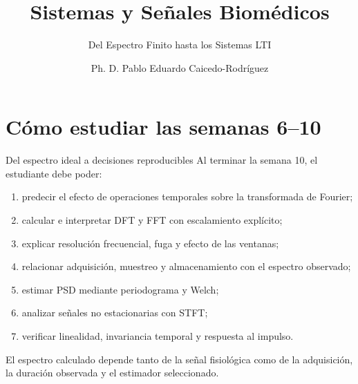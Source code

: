\documentclass[
  ignorenonframetext,
  aspectratio=169,
  spanish,
]{beamer}
\title{\texorpdfstring{Sistemas y Señales
Biomédicos}{Sistemas y Señales Biomédicos}}
\subtitle{\texorpdfstring{Del Espectro Finito hasta los Sistemas
LTI}{Del Espectro Finito hasta los Sistemas LTI}}
\author{Ph. D. Pablo Eduardo Caicedo-Rodríguez}
\date{}
\providecommand{\faExclamation}{\faIcon{exclamation}}
\providecommand{\tightlist}{%
  \setlength{\itemsep}{0pt}\setlength{\parskip}{0pt}}
\begin{document}
\frame{\titlepage}


\section{Cómo estudiar las semanas
  6--10}\label{cuxf3mo-estudiar-las-semanas-610}

\begin{frame}{Del espectro ideal a decisiones reproducibles}
  \protect{}\label{del-espectro-ideal-a-decisiones-reproducibles}
  Al terminar la semana 10, el estudiante debe poder:

  \begin{enumerate}
    \tightlist
    \item
          predecir el efecto de operaciones temporales sobre la transformada de
          Fourier;
    \item
          calcular e interpretar DFT y FFT con escalamiento explícito;
    \item
          explicar resolución frecuencial, fuga y efecto de las ventanas;
    \item
          relacionar adquisición, muestreo y almacenamiento con el espectro
          observado;
    \item
          estimar PSD mediante periodograma y Welch;
    \item
          analizar señales no estacionarias con STFT;
    \item
          verificar linealidad, invariancia temporal y respuesta al impulso.
  \end{enumerate}

  \begin{tcolorbox}[enhanced jigsaw, arc=.35mm, bottomrule=.15mm, bottomtitle=1mm, breakable, colback=white, colbacktitle=quarto-callout-important-color!10!white, colframe=quarto-callout-important-color-frame, coltitle=black, left=2mm, leftrule=.75mm, opacityback=0, opacitybacktitle=0.6, rightrule=.15mm, title=\textcolor{quarto-callout-important-color}{\faExclamation}\hspace{0.5em}{Idea conductora}, titlerule=0mm, toprule=.15mm, toptitle=1mm]

    El espectro calculado depende tanto de la señal fisiológica como de la
    adquisición, la duración observada y el estimador seleccionado.

  \end{tcolorbox}
\end{frame}
\end{document}
